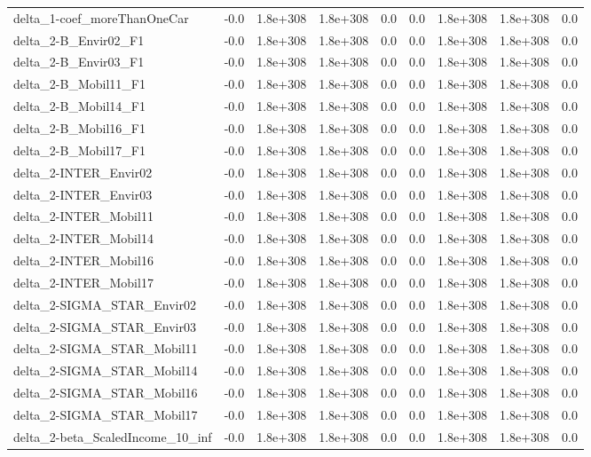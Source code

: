 \begin{tabular}{lrrrrrrrr}
delta_1-coef_moreThanOneCar & -0.0 & 1.8e+308 & 1.8e+308 & 0.0 & 0.0 & 1.8e+308 & 1.8e+308 & 0.0 \\
delta_2-B_Envir02_F1 & -0.0 & 1.8e+308 & 1.8e+308 & 0.0 & 0.0 & 1.8e+308 & 1.8e+308 & 0.0 \\
delta_2-B_Envir03_F1 & -0.0 & 1.8e+308 & 1.8e+308 & 0.0 & 0.0 & 1.8e+308 & 1.8e+308 & 0.0 \\
delta_2-B_Mobil11_F1 & -0.0 & 1.8e+308 & 1.8e+308 & 0.0 & 0.0 & 1.8e+308 & 1.8e+308 & 0.0 \\
delta_2-B_Mobil14_F1 & -0.0 & 1.8e+308 & 1.8e+308 & 0.0 & 0.0 & 1.8e+308 & 1.8e+308 & 0.0 \\
delta_2-B_Mobil16_F1 & -0.0 & 1.8e+308 & 1.8e+308 & 0.0 & 0.0 & 1.8e+308 & 1.8e+308 & 0.0 \\
delta_2-B_Mobil17_F1 & -0.0 & 1.8e+308 & 1.8e+308 & 0.0 & 0.0 & 1.8e+308 & 1.8e+308 & 0.0 \\
delta_2-INTER_Envir02 & -0.0 & 1.8e+308 & 1.8e+308 & 0.0 & 0.0 & 1.8e+308 & 1.8e+308 & 0.0 \\
delta_2-INTER_Envir03 & -0.0 & 1.8e+308 & 1.8e+308 & 0.0 & 0.0 & 1.8e+308 & 1.8e+308 & 0.0 \\
delta_2-INTER_Mobil11 & -0.0 & 1.8e+308 & 1.8e+308 & 0.0 & 0.0 & 1.8e+308 & 1.8e+308 & 0.0 \\
delta_2-INTER_Mobil14 & -0.0 & 1.8e+308 & 1.8e+308 & 0.0 & 0.0 & 1.8e+308 & 1.8e+308 & 0.0 \\
delta_2-INTER_Mobil16 & -0.0 & 1.8e+308 & 1.8e+308 & 0.0 & 0.0 & 1.8e+308 & 1.8e+308 & 0.0 \\
delta_2-INTER_Mobil17 & -0.0 & 1.8e+308 & 1.8e+308 & 0.0 & 0.0 & 1.8e+308 & 1.8e+308 & 0.0 \\
delta_2-SIGMA_STAR_Envir02 & -0.0 & 1.8e+308 & 1.8e+308 & 0.0 & 0.0 & 1.8e+308 & 1.8e+308 & 0.0 \\
delta_2-SIGMA_STAR_Envir03 & -0.0 & 1.8e+308 & 1.8e+308 & 0.0 & 0.0 & 1.8e+308 & 1.8e+308 & 0.0 \\
delta_2-SIGMA_STAR_Mobil11 & -0.0 & 1.8e+308 & 1.8e+308 & 0.0 & 0.0 & 1.8e+308 & 1.8e+308 & 0.0 \\
delta_2-SIGMA_STAR_Mobil14 & -0.0 & 1.8e+308 & 1.8e+308 & 0.0 & 0.0 & 1.8e+308 & 1.8e+308 & 0.0 \\
delta_2-SIGMA_STAR_Mobil16 & -0.0 & 1.8e+308 & 1.8e+308 & 0.0 & 0.0 & 1.8e+308 & 1.8e+308 & 0.0 \\
delta_2-SIGMA_STAR_Mobil17 & -0.0 & 1.8e+308 & 1.8e+308 & 0.0 & 0.0 & 1.8e+308 & 1.8e+308 & 0.0 \\
delta_2-beta_ScaledIncome_10_inf & -0.0 & 1.8e+308 & 1.8e+308 & 0.0 & 0.0 & 1.8e+308 & 1.8e+308 & 0.0 \\

\end{tabular}

